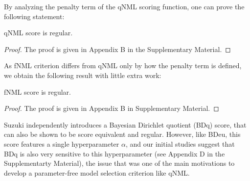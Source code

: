 By analyzing the penalty term of the qNML scoring function, one can prove the following statement:
\begin{theorem}
qNML score is regular.
\end{theorem}
\begin{proof}
The proof is given in Appendix B in the Supplementary Material.
\end{proof}
As fNML criterion differs from qNML only by how the penalty term is defined, we obtain the following result with little extra work:
\begin{theorem}
fNML score is regular.
\end{theorem}
\begin{proof}
The proof is given in Appendix B in Supplementary Material.
\end{proof}

Suzuki \cite{Suzuki2017} independently introduces a Bayesian Dirichlet
quotient (BDq) score, that can also be shown to be score equivalent
and regular.  However, like BDeu, this score features a single
hyperparameter $\alpha$, and our initial studies suggest that BDq is
also very sensitive to this hyperparameter (see Appendix D in the
Supplementarty Material), the issue that was one of the main
motivations to develop a parameter-free model selection criterion like
qNML.
